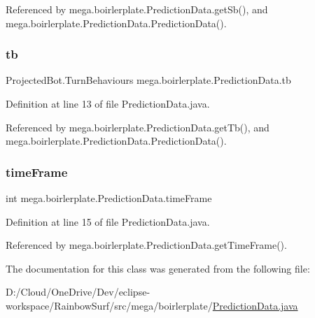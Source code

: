 Referenced by mega.\+boirlerplate.\+Prediction\+Data.\+get\+Sb(), and mega.\+boirlerplate.\+Prediction\+Data.\+Prediction\+Data().

\mbox{\label{classmega_1_1boirlerplate_1_1_prediction_data_a28c4b54db156041f9c59b34af0d0ce68}} 
\subsubsection{\texorpdfstring{tb}{tb}}
{\footnotesize\ttfamily Projected\+Bot.\+Turn\+Behaviours mega.\+boirlerplate.\+Prediction\+Data.\+tb\hspace{0.3cm}{\ttfamily [private]}}



Definition at line 13 of file Prediction\+Data.\+java.



Referenced by mega.\+boirlerplate.\+Prediction\+Data.\+get\+Tb(), and mega.\+boirlerplate.\+Prediction\+Data.\+Prediction\+Data().

\mbox{\label{classmega_1_1boirlerplate_1_1_prediction_data_a1dac7e8a3dfbcb90b2f8fdf173435b19}} 
\subsubsection{\texorpdfstring{time\+Frame}{timeFrame}}
{\footnotesize\ttfamily int mega.\+boirlerplate.\+Prediction\+Data.\+time\+Frame\hspace{0.3cm}{\ttfamily [private]}}



Definition at line 15 of file Prediction\+Data.\+java.



Referenced by mega.\+boirlerplate.\+Prediction\+Data.\+get\+Time\+Frame().



The documentation for this class was generated from the following file\+:\begin{DoxyCompactItemize}
\item 
D\+:/\+Cloud/\+One\+Drive/\+Dev/eclipse-\/workspace/\+Rainbow\+Surf/src/mega/boirlerplate/\hyperlink{_prediction_data_8java}{Prediction\+Data.\+java}\end{DoxyCompactItemize}
